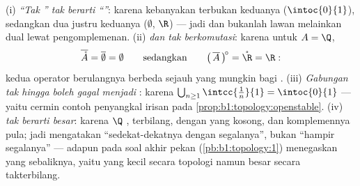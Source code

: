 \begin{remark}
(i) \emph{``Tak '' tak berarti ``''}: karena kebanyakan
 terbukan keduanya ($\intoc{0}{1}$), sedangkan dua  justru keduanya
($\emptyset$, $\R$) --- jadi  dan  bukanlah lawan melainkan
dual lewat pengomplemenan. (ii) \emph{ dan 
tak berkomutasi}: karena untuk $A = \Q$,
\[
\overline{\mathring A} = \overline\emptyset = \emptyset
\qquad\text{sedangkan}\qquad
\bigl(\,\overline A\,\bigr)^{\!\circ} = \mathring \R = \R :
\]
kedua operator berulangnya berbeda sejauh yang mungkin bagi . (iii)
\emph{Gabungan tak hingga  boleh gagal menjadi }:
karena $\bigcup_{n\geq1} \intcc{\frac1n}{1} = \intoc{0}{1}$ --- yaitu
cermin contoh penyangkal irisan pada
\cref{prop:b1:topology:openstable}. (iv) \emph{ tak
berarti besar}: karena $\Q$ , terbilang, dengan  yang kosong, dan
komplemennya  pula; jadi  mengatakan ``sedekat-dekatnya dengan
segalanya'', bukan ``hampir segalanya'' --- adapun  pada soal akhir
pekan (\cref{pb:b1:topology:1}) menegaskan yang sebaliknya,
yaitu  yang kecil secara topologi namun besar secara takterbilang.
\end{remark}

